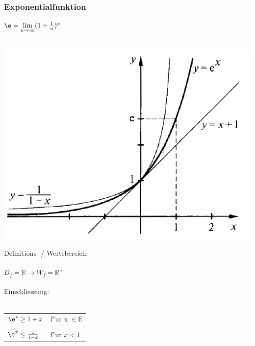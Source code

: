			
			\subsubsection{Exponentialfunktion}
			$\e = \lim\limits_{n \to \infty} (1+\frac{1}{n})^n $ \\
			\\
			\begin{minipage}{.45\linewidth}
			\includegraphics[width=0.95\linewidth]{Bilder/exp-funktion}
			
			\end{minipage}
			\hfill
			\begin{minipage}{.5\linewidth}
			Definitions- / Wertebereich: \\
			\\
			$D_f = \mathbb{R} \rightarrow W_f = \mathbb{R^+}$ \\
			\\
			Einschliessung: \\
			\\
			\begin{tabular}{ll}
			$\e^x \geq 1 + x$ & f"ur x $\in \mathbb{R}$ \\
			\\
			$\e^x \leq \frac{1}{1-x}$ & f"ur $x < 1$  \\
			\end{tabular}
			\end{minipage}
			
			
			
